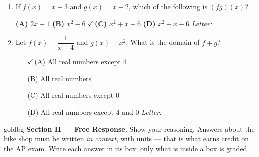 \documentclass[10pt]{article}
\begin{document}
\begin{enumerate}[leftmargin=1.9em, itemsep=12pt]
\item If $f(x) = x + 3$ and $g(x) = x - 2$, which of the following is $(fg)(x)$?

      \smallskip
      \textbf{(A)} $2x + 1$ \hspace{2.0em} \textbf{(B)} $x^2 - 6$ \hspace{2.0em} {\color{keyred}\textbf{$\checkmark$\,(C)}} $x^2 + x - 6$ \hspace{2.0em} \textbf{(D)} $x^2 - x - 6$ \hfill\textit{Letter:}~\gradedblank[id=ap4, type=choice, points=1, answer=C]{0.42in}{13pt}

\boxguard[9]
\item Let $f(x) = \dfrac{1}{x - 4}$ and $g(x) = x^2$. What is the domain of $f + g$?
      \begin{enumerate}[leftmargin=2.6em, itemsep=2pt]
        \item[{\color{keyred}$\checkmark$\,(A)}] All real numbers except $4$
        \item[(B)] All real numbers
        \item[(C)] All real numbers except $0$
        \item[(D)] All real numbers except $4$ and $0$ \hfill\textit{Letter:}~\gradedblank[id=ap5, type=choice, points=1, answer=A]{0.42in}{13pt}
      \end{enumerate}

\end{enumerate}

\newpage

\begin{headlinebox}{goldbg}
\small
\textbf{Section II --- Free Response.} Show your reasoning. Answers about the bike shop must be
written \emph{in context}, with units --- that is what earns credit on the AP exam. Write each answer in its box; only what is inside a box is graded.
\end{headlinebox}

\vspace{0.08in}
\end{document}
